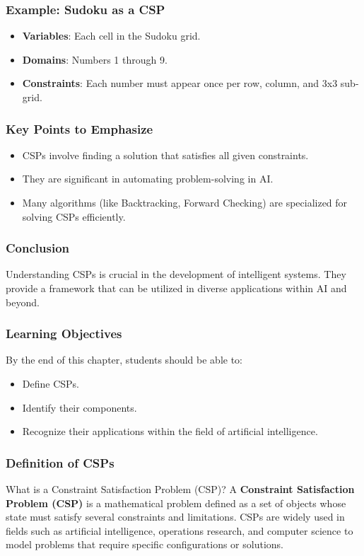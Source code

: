 \documentclass[aspectratio=169]{beamer}
\begin{document}
\begin{frame}[fragile]
    \frametitle{Example: Sudoku as a CSP}
    \begin{itemize}
        \item {\bf Variables}: Each cell in the Sudoku grid.
        \item {\bf Domains}: Numbers 1 through 9.
        \item {\bf Constraints}: Each number must appear once per row, column, and 3x3 sub-grid.
    \end{itemize}
\end{frame}

\begin{frame}[fragile]
    \frametitle{Key Points to Emphasize}
    \begin{itemize}
        \item CSPs involve finding a solution that satisfies all given constraints.
        \item They are significant in automating problem-solving in AI.
        \item Many algorithms (like Backtracking, Forward Checking) are specialized for solving CSPs efficiently.
    \end{itemize}
\end{frame}

\begin{frame}[fragile]
    \frametitle{Conclusion}
    Understanding CSPs is crucial in the development of intelligent systems. They provide a framework that can be utilized in diverse applications within AI and beyond.
\end{frame}

\begin{frame}[fragile]
    \frametitle{Learning Objectives}
    By the end of this chapter, students should be able to:
    \begin{itemize}
        \item Define CSPs.
        \item Identify their components.
        \item Recognize their applications within the field of artificial intelligence.
    \end{itemize}
\end{frame}

\begin{frame}[fragile]
    \frametitle{Definition of CSPs}
    \begin{block}{What is a Constraint Satisfaction Problem (CSP)?}
        A \textbf{Constraint Satisfaction Problem (CSP)} is a mathematical problem defined as a set of objects whose state must satisfy several constraints and limitations. 
        CSPs are widely used in fields such as artificial intelligence, operations research, and computer science to model problems that require specific configurations or solutions.
    \end{block}
\end{frame}
\end{document}

